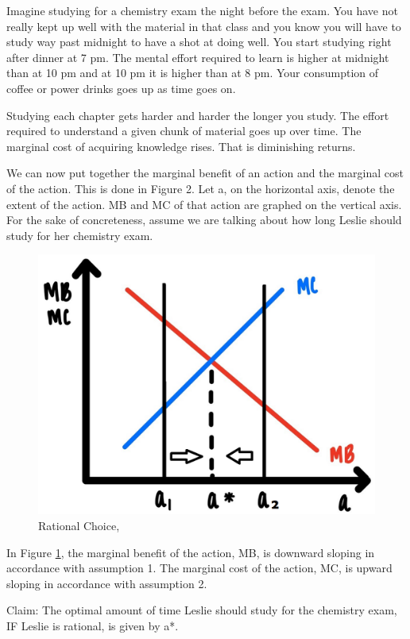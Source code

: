 \documentclass[
]{book}
\begin{document}
Imagine studying for a chemistry exam the night before the exam. You have not really kept up well with the material in that class and you know you will have to study way past midnight to have a shot at doing well. You start studying right after dinner at 7 pm. The mental effort required to learn is higher at midnight than at 10 pm and at 10 pm it is higher than at 8 pm. Your consumption of coffee or power drinks goes up as time goes on.

Studying each chapter gets harder and harder the longer you study. The effort required to understand a given chunk of material goes up over time. The marginal cost of acquiring knowledge rises. That is diminishing returns.

We can now put together the marginal benefit of an action and the marginal cost of the action. This is done in Figure 2. Let a, on the horizontal axis, denote the extent of the action. MB and MC of that action are graphed on the vertical axis. For the sake of concreteness, assume we are talking about how long Leslie should study for her chemistry exam.

\begin{figure}

{\centering \includegraphics[width=0.75\linewidth]{img/rationalchoice/fig2} 

}

\caption{Rational Choice,}\label{fig:rationalchoice02}
\end{figure}

In Figure \ref{fig:rationalchoice02}, the marginal benefit of the action, MB, is downward sloping in accordance with assumption 1. The marginal cost of the action, MC, is upward sloping in accordance with assumption 2.

Claim: The optimal amount of time Leslie should study for the chemistry exam, IF Leslie is rational, is given by a*.
\end{document}

